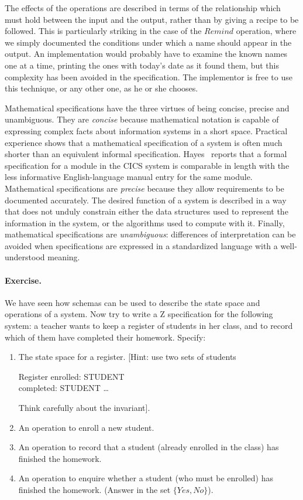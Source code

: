 \documentclass[12pt]{article}
\begin{document}
The effects of the operations are described in terms of the
relationship which must hold between the input and the
output, rather than by giving a recipe to be followed. This
is particularly striking in the case of the $Remind$
operation, where we simply documented the conditions under
which a name should appear in the output. An implementation
would probably have to examine the known names one at a
time, printing the ones with today's date as it found them,
but this complexity has been avoided in the specification. The
implementor is free to use this technique, or any other one,
as he or she chooses.

Mathematical specifications have the three virtues of being concise,
precise and unambiguous.  They are {\em concise\/} because
mathematical notation is capable of expressing complex facts about
information systems in a short space.  Practical experience shows that
a mathematical specification of a system is often much shorter than an
equivalent informal specification.  Hayes~\cite{Hayes} reports that a
formal specification for a module in the CICS system is comparable in
length with the less informative English-language manual entry for the
same module.  Mathematical specifications are {\em precise\/} because
they allow requirements to be documented accurately. The desired
function of a system is described in a way that does not unduly
constrain either the data structures used to represent the information
in the system, or the algorithms used to compute with it.  Finally,
mathematical specifications are {\em unambiguous}: differences of
interpretation can be avoided when specifications are expressed in a
standardized language with a well-understood meaning.

\paragraph{Exercise.}
We have seen how schemas can be used to describe the
state space and operations of a system. Now try to write a Z
specification for the following system:
a teacher wants to keep a register of students in her class,
and to record which of them have completed their homework.
Specify:
\begin{enumerate}
\item	The state space for a register. [Hint: use two sets
	of students
	\begin{schema}{Register}
		enrolled: \power STUDENT \\
		completed: \power STUDENT
	\where
		\ldots
	\end{schema}
	Think carefully about the invariant].
\item	An operation to enroll a new student.
\item	An operation to record that a student (already
	enrolled in the class) has finished the homework.
\item	An operation to enquire whether a student (who must
	be enrolled) has finished the homework. (Answer in
	the set $\{Yes, No\}$).
\end{enumerate}
\end{document}
